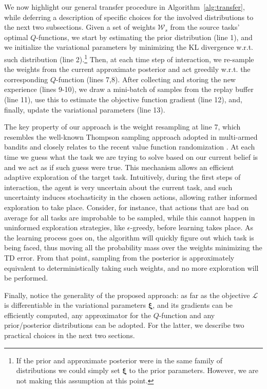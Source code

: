 \documentclass{article}
\begin{document}
We now highlight our general transfer procedure in Algorithm~\ref{alg:transfer}, while deferring a description of specific choices for the involved distributions to the next two subsections. Given a set of weights $\mathcal{W}_s$ from the source tasks' optimal $Q$-functions, we start by estimating the prior distribution (line 1), and we initialize the variational parameters by minimizing the KL divergence w.r.t. such distribution (line 2).\footnote{If the prior and approximate posterior were in the same family of distributions we could simply set $\bm{\xi}$ to the prior parameters. However, we are not making this assumption at this point.} Then, at each time step of interaction, we re-sample the weights from the current approximate posterior and act greedily w.r.t. the corresponding $Q$-function (lines 7,8). After collecting and storing the new experience (lines 9-10), we draw a mini-batch of samples from the replay buffer (line 11), use this to estimate the objective function gradient (line 12), and, finally, update the variational parameters (line 13).

The key property of our approach is the weight resampling at line 7, which resembles the well-known Thompson sampling approach adopted in multi-armed bandits \cite{bubeck2012regret} and closely relates to the recent value function randomization \cite{osband2014generalization}. At each time we guess what the task we are trying to solve based on our current belief is and we act as if such guess were true. This mechanism allows an efficient adaptive exploration of the target task. Intuitively, during the first steps of interaction, the agent is very uncertain about the current task, and such uncertainty induces stochasticity in the chosen actions, allowing rather informed exploration to take place. Consider, for instance, that actions that are bad on average for all tasks are improbable to be sampled, while this cannot happen in uninformed exploration strategies, like $\epsilon$-greedy, before learning takes place. As the learning process goes on, the algorithm will quickly figure out which task is being faced, thus moving all the probability mass over the weights minimizing the TD error. From that point, sampling from the posterior is approximately equivalent to deterministically taking such weights, and no more exploration will be performed.

Finally, notice the generality of the proposed approach: as far as the objective $\mathcal{L}$ is differentiable in the variational parameters $\bm{\xi}$, and its gradients can be efficiently computed, any approximator for the $Q$-function and any prior/posterior distributions can be adopted. For the latter, we describe two practical choices in the next two sections.
\end{document}
